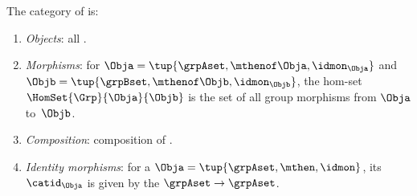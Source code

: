\begin{ctdefinition}
    \label{def:Grp}
    The category \Grp of  is:
    \begin{enumerate}
        \item \emph{Objects}: all .
        \item \emph{Morphisms}: for  $\Obja = \tup{\grpAset, \mthenof \Obja, \idmon_\Obja}$ and $\Objb = \tup{\grpBset, \mthenof \Objb, \idmon_\Objb}$,  the hom-set $\HomSet{\Grp}{\Obja}{\Objb}$ is the set of all group morphisms from $\Obja$ to~$\Objb$.
        \item \emph{Composition}: composition of .
        \item \emph{Identity morphisms}: for a  $\Obja = \tup{\grpAset, \mthen, \idmon}$, its  $\catid_\Obja$ is given by the  $\grpAset \to \grpAset$.
    \end{enumerate}
\end{ctdefinition}

